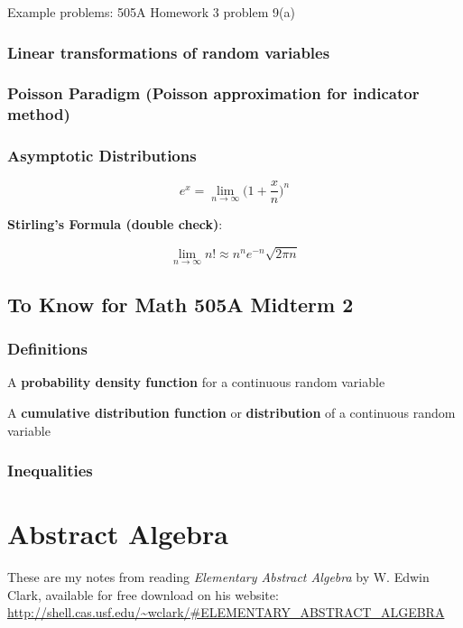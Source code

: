 \documentclass{article}
\begin{document}
Example problems: 505A Homework 3 problem 9(a)

\subsubsection{Linear transformations of random variables}

\subsubsection{Poisson Paradigm (Poisson approximation for indicator method)}

\subsubsection{Asymptotic Distributions}

\[
e^x = \lim_{n \to \infty} \bigg( 1 + \frac{x}{n}\bigg)^n
\]

\textbf{Stirling's Formula (double check)}: 

\[
\lim_{n \to \infty} n! \approx n^ne^{-n} \sqrt{2\pi n}
\]

\subsection{To Know for Math 505A Midterm 2}

\subsubsection{Definitions}

A \textbf{probability density function} for a continuous random variable 

A \textbf{cumulative distribution function} or \textbf{distribution} of a continuous random variable

\subsubsection{Inequalities}

\pagebreak


\section{Abstract Algebra}

These are my notes from reading \textit{Elementary Abstract Algebra} by W. Edwin Clark, available for free download on his website: \url{http://shell.cas.usf.edu/~wclark/#ELEMENTARY_ABSTRACT_ALGEBRA}
\end{document}
